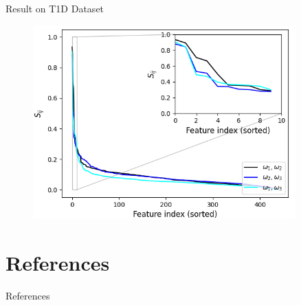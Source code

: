 \documentclass{beamer}					%
\begin{document}
\begin{frame}{Result on T1D Dataset}
\begin{center}
\begin{figure}
\includegraphics[width=0.9\textwidth]{kld.png}
\end{figure}
\end{center}
\end{frame}

\section{References}

\begin{frame}[allowframebreaks]{References}
	\tiny
	
\end{frame}
\end{document}
